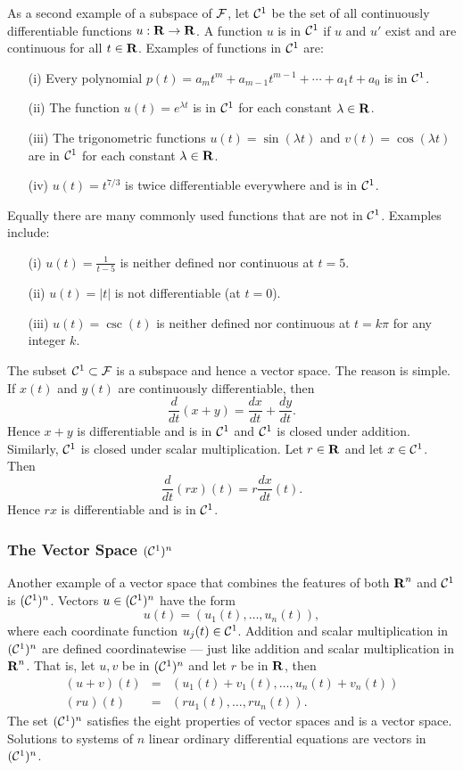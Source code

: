 \documentclass{ximera}
\begin{document}
As a second example of a subspace of ${\cal F}$, let ${\cal C}^1$ be the set of
all continuously differentiable functions $u:\mbox{$\bf{R}$}\to\mbox{$\bf{R}$}$.  A function $u$ is
in ${\cal C}^1$ if $u$ and $u'$ exist and are continuous for all $t\in\mbox{$\bf{R}$}$.
Examples of functions in ${\cal C}^1$ are:
\begin{enumerate}
\item[(i)] Every polynomial $p(t)=a_mt^m+a_{m-1}t^{m-1}+\cdots
+a_1t+a_0$ is in ${\cal C}^1$. 
\item[(ii)]  The function $u(t)=e^{\lambda t}$ is in ${\cal C}^1$
for each constant $\lambda\in\mbox{$\bf{R}$}$.
\item[(iii)]  The trigonometric functions $u(t)=\sin(\lambda t)$
and $v(t)=\cos(\lambda t)$ are in ${\cal C}^1$ for each constant
$\lambda\in\mbox{$\bf{R}$}$. 
\item[(iv)] $u(t)=t^{7/3}$ is twice differentiable everywhere and is
in ${\cal C}^1$.
\end{enumerate}
Equally there are many commonly used functions that are not in
${\cal C}^1$.  Examples include:
\begin{enumerate}
\item[(i)] $u(t)=\frac{1}{t-5}$ is neither defined nor
continuous at $t=5$.
\item[(ii)] $u(t)=|t|$ is not differentiable (at $t=0$).
\item[(iii)] $u(t)=\csc(t)$ is neither defined nor continuous at
$t=k\pi$ for any integer $k$.
\end{enumerate}

The subset ${\cal C}^1\subset{\cal F}$  is a subspace and hence a vector space.
The reason is simple.  If $x(t)$ and $y(t)$ are continuously differentiable,
then
\[
\frac{d}{dt}(x+y) = \frac{dx}{dt}+\frac{dy}{dt}.
\]
Hence $x+y$ is differentiable and is in ${\cal C}^1$ and ${\cal C}^1$ is closed under
addition.  Similarly, ${\cal C}^1$ is closed under scalar multiplication.  Let
$r\in\mbox{$\bf{R}$}$ and let $x\in{\cal C}^1$. Then
\[
\frac{d}{dt}(rx)(t) = r\frac{dx}{dt}(t).
\]
Hence $rx$ is differentiable and is in ${\cal C}^1$.

\subsubsection*{The Vector Space $({\cal C}^1)^n$}

Another example of a vector space that combines the features of
both $\mbox{$\bf{R}$}^n$ and ${\cal C}^1$ is $({\cal C}^1)^n$.  Vectors
$u\in ({\cal C}^1)^n$ have the form
\[
u(t) = (u_1(t),\ldots,u_n(t)),
\]
where each coordinate function $u_j(t)\in{\cal C}^1$.  Addition and
scalar multiplication in $({\cal C}^1)^n$ are defined coordinatewise
--- just like addition and scalar multiplication in $\mbox{$\bf{R}$}^n$.
That is, let $u,v$ be in $({\cal C}^1)^n$ and let $r$ be in $\mbox{$\bf{R}$}$, then
\begin{eqnarray*}
(u+v)(t) & = & (u_1(t)+v_1(t),\ldots,u_n(t)+v_n(t)) \\
(ru)(t) & = & (ru_1(t),\ldots,ru_n(t)).
\end{eqnarray*}
The set $({\cal C}^1)^n$ satisfies the eight properties of vector spaces and
is a vector space.  Solutions to systems of $n$ linear ordinary differential
equations are vectors in $({\cal C}^1)^n$.
\end{document}
